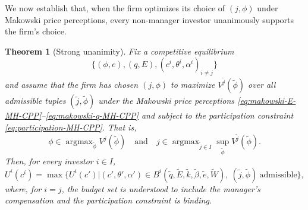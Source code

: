 \documentclass[11pt,a4paper,oneside]{book}
\def\et{\quad \text{and} \quad}
\DeclareMathOperator*{\argmax}{argmax}
\theoremstyle{plain}
\newtheorem{theorem}{Theorem}[chapter]
\theoremstyle{definition}
\theoremstyle{remark}
\numberwithin{equation}{chapter}
\begin{document}
We now establish that, when the firm optimizes its choice of $(j, \phi)$ under Makowski price perceptions, every non-manager investor unanimously supports the firm's choice.

\begin{theorem}[Strong unanimity]\label{thm:unanimity-MH-CPP}
Fix a competitive equilibrium
\begin{equation*}
  \bigl\{ (\phi, e), (q, E), (c^i, \theta^i, \alpha^i)_{i \neq j} \bigr\}
\end{equation*}
and assume that the firm has chosen $(j, \phi)$ to maximize $V^{\widetilde{j}}(\widetilde{\phi})$ over all admissible tuples $(\widetilde{j}, \widetilde{\phi})$ under the Makowski price perceptions \eqref{eq:makowski-E-MH-CPP}--\eqref{eq:makowski-q-MH-CPP} and subject to the participation constraint \eqref{eq:participation-MH-CPP}.
That is,
\begin{equation*}
  \phi \in \argmax_{\widetilde{\phi}} V^j(\widetilde{\phi})
  \et
  j \in \argmax_{\widetilde{j} \in I} \sup_{\widetilde{\phi}} V^{\widetilde{j}}(\widetilde{\phi}).
\end{equation*}
Then, for every investor $i \in I$,
\begin{equation}\label{eq:strong-unanimity-MH-CPP}
  U^i(c^i) = \max \bigl\{ U^i(c') \vert (c', \theta', \alpha') \in B^i(\widetilde{q}, \widetilde{E}, \widetilde{k}, \widetilde{\beta}, \widetilde{e}, \widetilde{W}), \ (\widetilde{j}, \widetilde{\phi}) \ \text{admissible} \bigr\},
\end{equation}
where, for $i = j$, the budget set is understood to include the manager's compensation and the participation constraint is binding.
\end{theorem}
\end{document}
